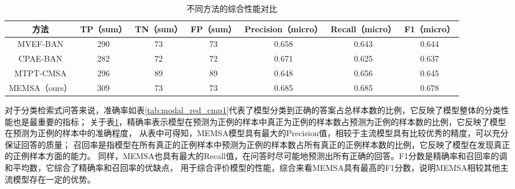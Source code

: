 \begin{table}
	\caption{\label{tab:confusionmatrix}不同方法的综合性能对比}
	\centering
	\small
	\begin{tabular}{c|cccccc}
		\hline  方法 & TP（sum） & TN（sum） & FP（sum） & Precision（micro） & Recall（micro） & F1（micro） \\
		\hline MVEF-BAN & 290 & 73 & 73 & 0.658 & 0.643 & 0.644 \\
		CPAE-BAN & 282 & 72 & 72 & 0.671 & 0.625 & 0.637 \\
		MTPT-CMSA & 296 & 89 & 89 & 0.648 & 0.656 & 0.645 \\
		MEMSA（ours） & 309 & 73 & 73 & 0.685 & 0.685 & $\mathbf{0.678}$ \\
		\hline
		\end{tabular}
\end{table}

对于分类检索式问答来说，准确率如表\ref{tab:modal_red_cmp1}代表了模型分类到正确的答案占总样本数的比例，它反映了模型整体的分类性能也是最重要的指标；
关于表\ref{tab:confusionmatrix}，精确率表示模型在预测为正例的样本中真正为正例的样本数占预测为正例的样本数的比例，它反映了模型在预测为正例的样本中的准确程度，
从表中可得知，MEMSA模型具有最大的Precision值，相较于主流模型具有比较优秀的精度，可以充分保证回答的质量；
召回率是指模型在所有真正的正例样本中预测为正例的样本数占所有真正的正例样本数的比例，它反映了模型在发现真正的正例样本方面的能力。
同样，MEMSA也具有最大的Recall值，在问答时尽可能地预测出所有正确的回答。F1分数是精确率和召回率的调和平均数，它综合了精确率和召回率的优缺点，
用于综合评价模型的性能，综合来看MEMSA具有最高的F1分数，说明MEMSA相较其他主流模型存在一定的优势。




